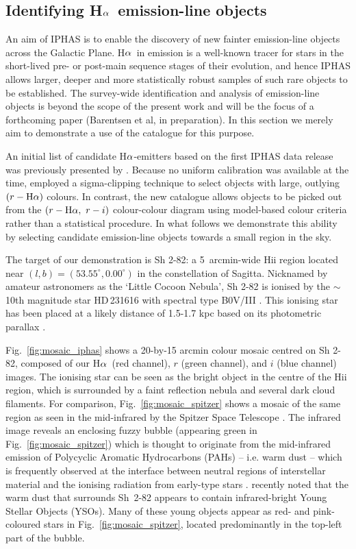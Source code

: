 \documentclass[useAMS,usenatbib]{mn2e}
\def\ha{\mbox{H$\rm \alpha$}}
\begin{document}
\subsection{Identifying \ha\ emission-line objects}

An aim of IPHAS is to enable the discovery 
of new fainter emission-line objects
across the Galactic Plane.
\ha\ in emission is a well-known tracer
for stars in the short-lived pre- or
post-main sequence stages of their evolution,
and hence IPHAS allows larger, deeper
and more statistically robust samples
of such rare objects to be established.
The survey-wide identification and analysis 
of emission-line objects is beyond the scope
of the present work and will be the focus
of a forthcoming paper (Barentsen et al, in preparation).
In this section we merely aim to demonstrate
a use of the catalogue for this purpose.

An initial list of candidate \ha-emitters
based on the first IPHAS data release was previously
presented by \cite{Witham2008}. 
Because no uniform calibration was available
at the time, \citeauthor{Witham2008} employed 
a sigma-clipping technique to select objects with
large, outlying $(r-\ha)$ colours.
In contrast, the new catalogue
allows objects to be picked out
from the $(r-\ha,\ r-i)$ colour-colour diagram
using model-based colour criteria
rather than a statistical procedure.
In what follows we demonstrate this ability 
by selecting candidate emission-line objects
towards a small region in the sky.

The target of our demonstration is Sh 2-82:
a 5~arcmin-wide H{\sc ii} region located near $(l,b)=(53.55^\circ, 0.00^\circ)$
in the constellation of Sagitta.
Nicknamed by amateur astronomers as the `Little Cocoon Nebula',
Sh 2-82 is ionised by 
the $\sim$10th magnitude star HD\,231616
with spectral type B0V/III
\citep{Georgelin1973,Mayer1973,Hunter1990}.
This ionising star has been placed 
at a likely distance of 1.5-1.7 kpc
based on its photometric parallax
\citep{Mayer1973,Lahulla1985,Hunter1990}.

Fig.~\ref{fig:mosaic_iphas} shows a 20-by-15 arcmin
colour mosaic centred on Sh 2-82,
composed of our \ha\ (red channel),
$r$ (green channel),
and $i$ (blue channel) images.
The ionising star can be seen as the bright object
in the centre of the H{\sc ii} region,
which is surrounded by a faint reflection nebula
and several dark cloud filaments.
For comparison, Fig.~\ref{fig:mosaic_spitzer} shows
a mosaic of the same region 
as seen in the mid-infrared by the Spitzer Space Telescope \citep[GLIMPSE survey;][]{Benjamin2003,Churchwell2009}.
The infrared image reveals an enclosing fuzzy bubble (appearing
green in Fig.~\ref{fig:mosaic_spitzer})
which is thought to originate from the
mid-infrared emission of Polycyclic Aromatic Hydrocarbons (PAHs)
-- i.e. warm dust --
which is frequently observed
at the interface between neutral regions of interstellar material
and the ionising radiation from early-type stars \citep{Churchwell2006}.
\cite{Yu2012}
recently noted that the warm dust
that surrounds Sh~2-82 
appears to contain infrared-bright
Young Stellar Objects (YSOs).
Many of these young objects 
appear as red- and pink-coloured stars
in Fig.~\ref{fig:mosaic_spitzer},
located predominantly in the top-left part
of the bubble.
\end{document}
